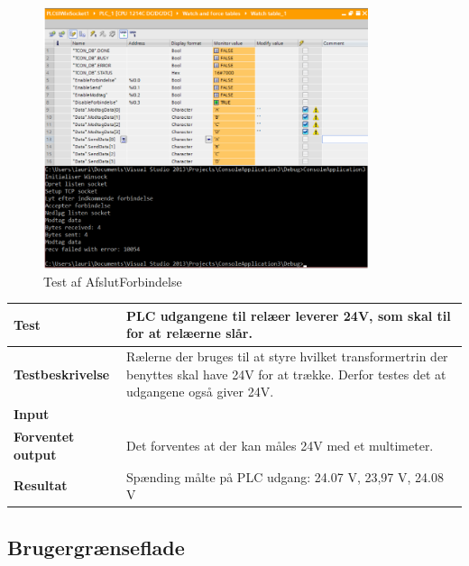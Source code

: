 \begin{figure}[H] %
	\centering
	\includegraphics[width=0.85\textwidth]{Test/ModultestStyringsenhed/AfslutForbindelse}
	\caption{Test af AfslutForbindelse}
	\label{fig:AfslutForbindelse}
\end{figure}

\begin{center}
	\begin{tabular}{ | m{} | m{}|} 
		\hline
		\textbf{Test}					&PLC udgangene til relæer leverer 24V, som skal til for at relæerne slår. \\ \hline
		\textbf{Testbeskrivelse}		&Rælerne der bruges til at styre hvilket transformertrin der benyttes skal have 24V for at trække. Derfor testes det at udgangene også giver 24V.\\ \hline
		\textbf{Input}					& \\ \hline
		\textbf{Forventet output}		&Det forventes at der kan måles 24V med et multimeter.\\ \hline
		\textbf{Resultat}				&Spænding målte på PLC udgang: 24.07 V, 23,97 V, 24.08 V   \\ \hline
	\end{tabular}
\end{center}

\subsection{Brugergrænseflade}

